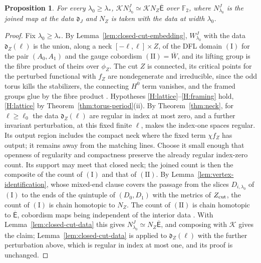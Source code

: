 \documentclass[11pt]{amsart}
\newtheorem{proposition}[theorem]{Proposition}
\theoremstyle{definition}
\theoremstyle{remark}
\theoremstyle{plain}
\numberwithin{equation}{section}
\newcommand{\FF}{\mathbb{F}_2}
\begin{document}
\begin{proposition}\label{prop:closed-cut}
For every $\lambda_0\ge\lambda_*$, $\mathcal KN^J_{\lambda_0}\simeq\mathcal KN_Z\overline{\mathsf E}$ over $\FF$,
where $N^J_{\lambda_0}$ is the joined map at the data $\mathfrak d_J$ and $N_Z$ is taken with the data at width $\lambda_0$.
\end{proposition}

\begin{proof}
Fix $\lambda_0\ge\lambda_*$. By Lemma~\ref{lem:closed-cut-embedding}, $W^J_{\lambda_0}$ with the data
$\mathfrak d_Z(\ell)$ is the union, along a neck $[-\ell,\ell]\times Z$, of the DFL domain $\mathrm{(I)}$
for the pair $(A_0,A_1)$ and the gauge cobordism $\mathrm{(II)}=\overline W$, and its lifting group is the fibre product of theirs over $\phi_Z$. The cut $Z$ is connected, its
critical points for the perturbed functional with $f_Z$ are nondegenerate and
irreducible, since the odd torus kills the stabilizers, the connecting $H^0$ term
vanishes, and the framed groups glue by the fibre product
\cite[Proposition~5.4]{KM-unknot}. Hypotheses \ref{H:lattice}--\ref{H:framing} hold,
\ref{H:lattice} by Theorem~\ref{thm:torus-period}(ii). By Theorem~\ref{thm:neck},
for $\ell\ge\ell_0$ the data $\mathfrak d_Z(\ell)$ are regular in index at most zero, and a
further invariant perturbation, at this fixed finite $\ell$,
makes the index-one spaces regular. Its output region includes the
compact neck where the fixed term $\chi f_Z$ has output; it remains
away from the matching lines. Choose it small enough that openness
of regularity and compactness preserve the already regular
index-zero count. Its support may meet that closed neck; the joined count is then the
composite of the count of $\mathrm{(I)}$ and that of $\mathrm{(II)}$. By
Lemma~\ref{lem:vertex-identification}, whose mixed-end clause covers the passage from
the slices $D_{i,\lambda_0}$ of $\mathrm{(I)}$ to the ends of the quintuple of $(D_0,D_1)$ with the
metrics of $Z_{\rm cut}$, the count of $\mathrm{(I)}$ is chain homotopic to $N_Z$. The count of
$\mathrm{(II)}$ is chain homotopic to $\overline{\mathsf E}$, cobordism maps being independent of the
interior data \cite[Section~5.1]{KM-unknot}. With Lemma~\ref{lem:closed-cut-data}
this gives $N^J_{\lambda_0}\simeq N_Z\overline{\mathsf E}$, and composing with $\mathcal K$ gives the claim;
Lemma~\ref{lem:closed-cut-data} is applied to $\mathfrak d_Z(\ell)$ with the further
perturbation above, which is regular in index at most one, and its proof is unchanged.
\end{proof}
\end{document}
